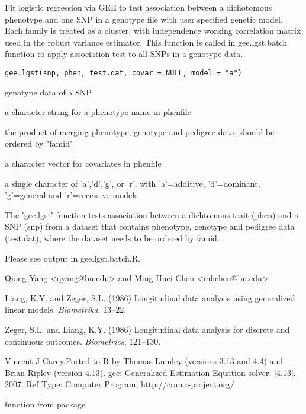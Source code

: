 \begin{Description}\relax
Fit logistic regression via GEE to test association between a dichotomous phenotype 
and one SNP in a genotype file with user specified genetic model. Each family is treated as 
a cluster, with independence working correlation matrix used in the robust variance estimator.
This function is called in gee.lgst.batch function to apply association test to all SNPs in a 
genotype data.
\end{Description}
\begin{Usage}
\begin{verbatim}
gee.lgst(snp, phen, test.dat, covar = NULL, model = "a")
\end{verbatim}
\end{Usage}
\begin{Arguments}
\begin{ldescription}
\item[\code{snp}] genotype data of a SNP 
\item[\code{phen}] a character string for a phenotype name in phenfile 
\item[\code{test.dat}] the product of merging phenotype, genotype and pedigree data, should be ordered by "famid" 
\item[\code{covar}] a character vector for covariates in phenfile 
\item[\code{model}] a single character of 'a','d','g', or 'r', with 'a'=additive, 'd'=dominant, 'g'=general and 'r'=recessive models 
\end{ldescription}
\end{Arguments}
\begin{Details}\relax
The 'gee.lgst' function tests association between a dichtomous trait (phen) and a SNP (snp) from a dataset that contains phenotype, genotype and 
pedigree data (test.dat), where the dataset needs to be ordered by famid.
\end{Details}
\begin{Value}
Please see output in gee.lgst.batch.R.
\end{Value}
\begin{Author}\relax
Qiong Yang <qyang@bu.edu> and Ming-Huei Chen <mhchen@bu.edu>
\end{Author}
\begin{References}\relax
Liang, K.Y. and Zeger, S.L. (1986)
Longitudinal data analysis using generalized linear models.
\emph{Biometrika},  13--22. 

Zeger, S.L. and Liang, K.Y. (1986)
Longitudinal data analysis for discrete and continuous outcomes.
\emph{Biometrics},  121--130.

Vincent J Carey.Ported to R by Thomas Lumley (versions 3.13 and 4.4) and Brian Ripley (version 4.13). gee: Generalized Estimation Equation solver. 
[4.13]. 2007. Ref Type: Computer Program, http://cran.r-project.org/
\end{References}
\begin{SeeAlso}\relax
{} function from package 
\end{SeeAlso}

